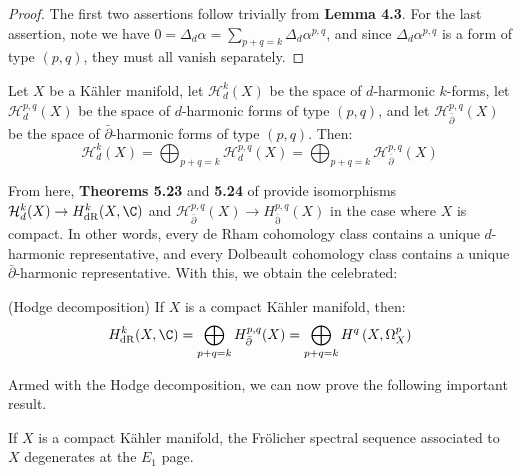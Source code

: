 \begin{proof}
    The first two assertions follow trivially from \textbf{Lemma 4.3}. For the last assertion, note we have $0 = \Delta_d\alpha = \sum_{p+q=k}\Delta_d\alpha^{p,q}$, and since $\Delta_d\alpha^{p,q}$ is a form of type $(p,q)$, they must all vanish separately.
\end{proof}

\begin{corollary}
    Let $X$ be a K\"ahler manifold, let $\mathcal{H}^k_d(X)$ be the space of $d$-harmonic $k$-forms, let $\mathcal{H}^{p,q}_d(X)$ be the space of $d$-harmonic forms of type $(p,q)$, and let $\mathcal{H}^{p,q}_{\bar\partial}(X)$ be the space of $\bar\partial$-harmonic forms of type $(p,q)$. Then:
    $$
    \mathcal{H}^{k}_d(X) = \bigoplus_{p+q=k}\mathcal{H}^{p,q}_{d}(X)=\bigoplus_{p+q=k}\mathcal{H}^{p,q}_{\bar\partial}(X)
    $$
\end{corollary}

\noindent From here, \textbf{Theorems 5.23} and \textbf{5.24} of \cite{VoisinI2002} provide isomorphisms $\mathcal{H}^k_d(X) \to H^k_\mathrm{dR}(X,\C)$ and $\mathcal{H}^{p,q}_{\bar\partial}(X) \to H^{p,q}_\mathrm{\bar\partial}(X)$ in the case where $X$ is compact. In other words, every de Rham cohomology class contains a unique $d$-harmonic representative, and every Dolbeault cohomology class contains a unique $\bar\partial$-harmonic representative. With this, we obtain the celebrated:
\begin{theorem}
    (Hodge decomposition) If $X$ is a compact K\"ahler manifold, then:
    $$
    H^k_\mathrm{dR}(X,\C) = \bigoplus_{p+q=k} H^{p,q}_{\bar\partial} (X) = \bigoplus_{p+q=k} H^q\left(X,\Omega_X^p\right)
    $$
\end{theorem}

\noindent Armed with the Hodge decomposition, we can now prove the following important result. 
\begin{theorem}
    If $X$ is a compact K\"ahler manifold, the Fr\"olicher spectral sequence associated to $X$ degenerates at the $E_1$ page. 
\end{theorem}

